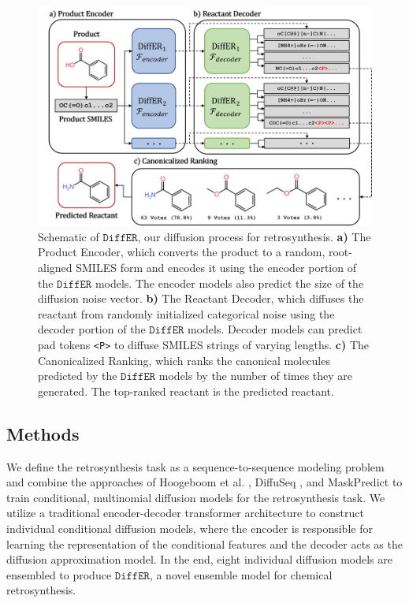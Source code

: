 \documentclass{article}
\newcommand{\ours}{$\texttt{DiffER}$\xspace}
\begin{document}
\begin{figure}
    \small
    \centering
    \includegraphics[width=0.9\linewidth]{images/diffusion_schema.png}
    \caption{Schematic of \ours, our diffusion process for retrosynthesis. \textbf{a)} The Product Encoder, which converts the product to a random, root-aligned SMILES form and encodes it using the encoder portion of the \ours models. The encoder models also predict the size of the diffusion noise vector. \textbf{b)} The Reactant Decoder, which diffuses the reactant from randomly initialized categorical noise using the decoder portion of the \ours models. Decoder models can predict pad tokens \texttt{<P>} to diffuse SMILES strings of varying lengths. \textbf{c)} The Canonicalized Ranking, which ranks the canonical molecules predicted by the \ours models by the number of times they are generated. The top-ranked reactant is the predicted reactant.}
    \label{fig:schema}
\end{figure}

\subsection{Methods}
\label{sec:methods}


We define the retrosynthesis task as a sequence-to-sequence modeling problem and combine the approaches of Hoogeboom et al. \cite{hoogeboom2021argmax}, DiffuSeq \cite{gong2022diffuseq, gong2023diffuseq}, and MaskPredict \cite{ghazvininejad2019mask} to train conditional, multinomial diffusion models for the retrosynthesis task. We utilize a traditional encoder-decoder transformer architecture to construct individual conditional diffusion models, where the encoder is responsible for learning the representation of the conditional features and the decoder acts as the diffusion approximation model. In the end, eight individual diffusion models are ensembled to produce \ours, a novel ensemble model for chemical retrosynthesis.
\end{document}
